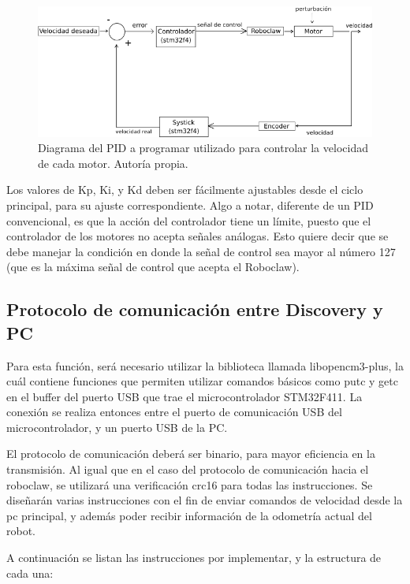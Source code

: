 \begin{figure}[H]
\centering
\includegraphics[scale=0.7]{imagenes/diagrama_pid.png}
\caption{Diagrama del PID a programar utilizado para controlar la velocidad de cada motor. Autoría propia.}
\label{F:pid_diagrama}
\end{figure}

Los valores de Kp, Ki, y Kd deben ser fácilmente ajustables desde el ciclo principal, para su ajuste correspondiente. Algo a notar, diferente de un PID convencional, es que la acción del controlador tiene un límite, puesto que el controlador de los motores no acepta señales análogas. Esto quiere decir que se debe manejar la condición en donde la señal de control sea mayor al número 127 (que es la máxima señal de control que acepta el Roboclaw).

\subsection{Protocolo de comunicación entre Discovery y PC}

\label{libreria}

Para esta función, será necesario utilizar la biblioteca llamada libopencm3-plus, la cuál contiene funciones que permiten utilizar comandos básicos como putc y getc en el buffer del puerto USB que trae el microcontrolador STM32F411. La conexión se realiza entonces entre el puerto de comunicación USB del microcontrolador, y un puerto USB de la PC.

El protocolo de comunicación deberá ser binario, para mayor eficiencia en la transmisión. Al igual que en el caso del protocolo de comunicación hacia el roboclaw, se utilizará una verificación crc16 para todas las instrucciones. Se diseñarán varias instrucciones con el fin de enviar comandos de velocidad desde la pc principal, y además poder recibir información de la odometría actual del robot.

A continuación se listan las instrucciones por implementar, y la estructura de cada una:

